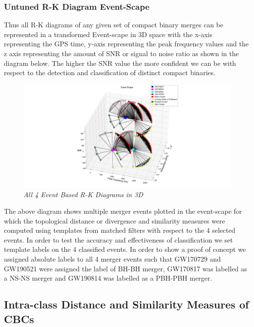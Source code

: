 \subsubsection{Untuned R-K Diagram Event-Scape}

Thus all R-K diagrams of any given set of compact binary merges can be represented in a transformed Event-scape in 3D space with the x-axis representing the GPS time, y-axis representing the peak frequency values and the z axis representing the amount of SNR or signal to noise ratio as shown in the diagram below. The higher the SNR value the more confident we can be with respect to the detection and classification of distinct compact binaries.

    \begin{figure}[H]
        \centering
        \includegraphics[width=1.0\linewidth]{images/74_33_All 4 Diagrmas in 3D_2.png}
        \caption{\textit{All 4 Event Based R-K Diagrams in 3D}}
        \label{fig:LIGO15_PlaceHolder_fig}
    \end{figure}

The above diagram shows multiple merger events plotted in the event-scape for which the topological distance or divergence and similarity measures were computed using templates from matched filters with respect to the 4 selected events. In order to test the accuracy and effectiveness of classification we set template labels on the 4 classified events. In order to show a proof of concept we assigned absolute labels to all 4 merger events such that GW170729 and GW190521 were assigned the label of BH-BH merger, GW170817 was labelled as a NS-NS merger and GW190814 was labelled as a PBH-PBH merger.

\subsection{Intra-class Distance and Similarity Measures of CBCs}

